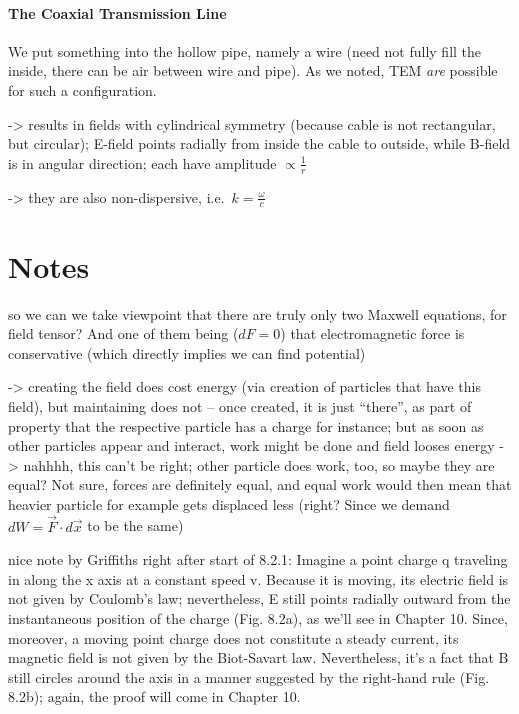\documentclass[../class_mech_main.tex]{subfiles}
\begin{document}



            \paragraph{The Coaxial Transmission Line}
We put something into the hollow pipe, namely a wire (need not fully fill the inside, there can be air between wire and pipe). As we noted, TEM \emph{are} possible for such a configuration.

-> results in fields with cylindrical symmetry (because cable is not rectangular, but circular); E-field points radially from inside the cable to outside, while B-field is in angular direction; each have amplitude $\propto \frac{1}{r}$

-> they are also non-dispersive, i.e.~$k = \frac{\omega}{c}$




    \section{Notes}

so we can we take viewpoint that there are truly only two Maxwell equations, for field tensor? And one of them being ($dF = 0$) that electromagnetic force is conservative (which directly implies we can find potential)



-> creating the field does cost energy (via creation of particles that have this field), but maintaining does not -- once created, it is just \enquote{there}, as part of property that the respective particle has a charge for instance; but as soon as other particles appear and interact, work might be done and field looses energy -> nahhhh, this can't be right; other particle does work, too, so maybe they are equal? Not sure, forces are definitely equal, and equal work would then mean that heavier particle for example gets displaced less (right? Since we demand $dW = \vec{F} \cdot d\vec{x}$ to be the same)



nice note by Griffiths right after start of 8.2.1: Imagine a point charge q traveling in along the x axis at a constant speed v. Because it is moving, its electric field is not given by Coulomb's law; nevertheless, E still points radially outward from the instantaneous position of the charge (Fig. 8.2a), as we'll see in Chapter 10. Since, moreover, a moving point charge does not constitute a steady current, its magnetic field is not given by the Biot-Savart law. Nevertheless, it's a fact that B still circles around the axis in a manner suggested by the right-hand rule (Fig. 8.2b); again, the proof will come in Chapter 10.
\end{document}
